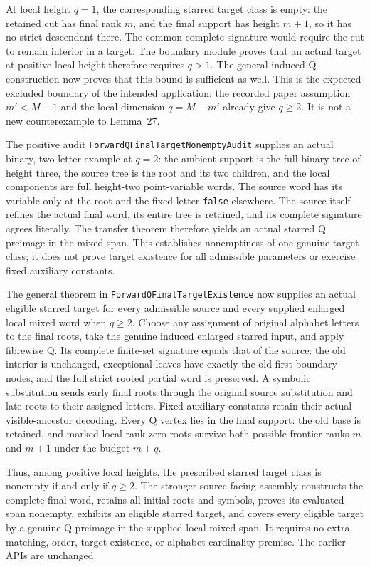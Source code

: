 \documentclass[11pt]{article}
\begin{document}
At local height $q=1$, the corresponding starred target class is empty:
the retained cut has final rank $m$, and the final support has height
$m+1$, so it has no strict descendant there.  The common complete
signature would require the cut to remain interior in a target.
The boundary module proves that an actual target at positive local
height therefore requires $q>1$.  The general induced-Q construction
now proves that this bound is sufficient as well.  This is the expected excluded
boundary of the intended application: the recorded paper assumption
$m'<M-1$ and the local dimension $q=M-m'$ already give $q\ge2$.
It is not a new counterexample to Lemma~27.

The positive audit \texttt{ForwardQFinalTargetNonemptyAudit} supplies an
actual binary, two-letter example at $q=2$: the ambient support is the
full binary tree of height three, the source tree is the root and its
two children, and the local components are full height-two point-variable
words.  The source word has its variable only at the root and the fixed
letter \texttt{false} elsewhere.  The source itself refines the actual
final word, its entire tree is retained, and its complete signature
agrees literally.  The transfer theorem therefore yields an actual
starred Q preimage in the mixed span.  This establishes nonemptiness of
one genuine target class; it does not prove target existence for all
admissible parameters or exercise fixed auxiliary constants.

The general theorem in \texttt{ForwardQFinalTargetExistence} now supplies
an actual eligible starred target for every admissible source and every
supplied enlarged local mixed word when $q\ge2$.  Choose any assignment
of original alphabet letters to the final roots, take the genuine induced
enlarged starred input, and apply fibrewise Q.  Its complete finite-set
signature equals that of the source: the old interior is unchanged,
exceptional leaves have exactly the old first-boundary nodes, and the full
strict rooted partial word is preserved.  A symbolic substitution sends
early final roots through the original source substitution and late roots
to their assigned letters.  Fixed auxiliary constants retain their actual
visible-ancestor decoding.  Every Q vertex lies in the final support:
the old base is retained, and marked local rank-zero roots survive both
possible frontier ranks $m$ and $m+1$ under the budget $m+q$.

Thus, among positive local heights, the prescribed starred target class
is nonempty if and only if $q\ge2$.  The stronger source-facing assembly
constructs the complete final word, retains all initial roots and symbols,
proves its evaluated span nonempty, exhibits an eligible starred target,
and covers every eligible target by a genuine Q preimage in the supplied
local mixed span.  It requires no extra matching, order, target-existence,
or alphabet-cardinality premise.  The earlier APIs are unchanged.
\end{document}
